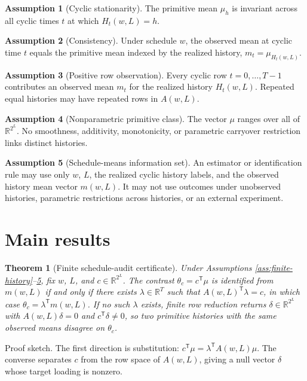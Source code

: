 \documentclass[11pt]{article}
\newcommand{\transpose}{\mathsf{T}}
\newcommand{\R}{\mathbb{R}}
\theoremstyle{definition}
\newtheorem{assumption}{Assumption}
\theoremstyle{plain}
\newtheorem{theorem}{Theorem}
\theoremstyle{remark}
\begin{document}
\begin{assumption}[Cyclic stationarity]\label{ass:cyclic-stationarity}
The primitive mean \(\mu_h\) is invariant across all cyclic times \(t\) at which \(H_t(w,L)=h\).
\end{assumption}

\begin{assumption}[Consistency]\label{ass:consistency}
Under schedule \(w\), the observed mean at cyclic time \(t\) equals the primitive mean indexed by the realized history, \(m_t=\mu_{H_t(w,L)}\).
\end{assumption}

\begin{assumption}[Positive row observation]\label{ass:positive-row}
Every cyclic row \(t=0,\ldots,T-1\) contributes an observed mean \(m_t\) for the realized history \(H_t(w,L)\). Repeated equal histories may have repeated rows in \(A(w,L)\).
\end{assumption}

\begin{assumption}[Nonparametric primitive class]\label{ass:nonparametric}
The vector \(\mu\) ranges over all of \(\R^{2^L}\). No smoothness, additivity, monotonicity, or parametric carryover restriction links distinct histories.
\end{assumption}

\begin{assumption}[Schedule-means information set]\label{ass:schedule-means}
An estimator or identification rule may use only \(w\), \(L\), the realized cyclic history labels, and the observed history mean vector \(m(w,L)\). It may not use outcomes under unobserved histories, parametric restrictions across histories, or an external experiment.
\end{assumption}

\section{Main results}
\begin{theorem}[Finite schedule-audit certificate]\label{thm:audit-certificate}
Under Assumptions \ref{ass:finite-history}--\ref{ass:schedule-means}, fix \(w\), \(L\), and \(c\in\R^{2^L}\). The contrast \(\theta_c=c^\transpose\mu\) is identified from \(m(w,L)\) if and only if there exists \(\lambda\in\R^T\) such that \(A(w,L)^\transpose\lambda=c\), in which case \(\theta_c=\lambda^\transpose m(w,L)\). If no such \(\lambda\) exists, finite row reduction returns \(\delta\in\R^{2^L}\) with \(A(w,L)\delta=0\) and \(c^\transpose\delta\neq0\), so two primitive histories with the same observed means disagree on \(\theta_c\).
\end{theorem}
Proof sketch. The first direction is substitution: \(c^\transpose\mu=\lambda^\transpose A(w,L)\mu\). The converse separates \(c\) from the row space of \(A(w,L)\), giving a null vector \(\delta\) whose target loading is nonzero.
\end{document}
